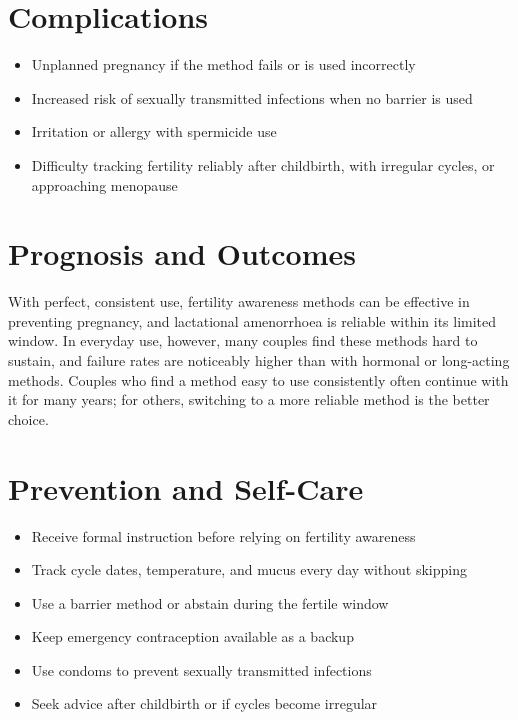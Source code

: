 \section*{Complications}
\begin{itemize}
    \item Unplanned pregnancy if the method fails or is used incorrectly
    \item Increased risk of sexually transmitted infections when no barrier is used
    \item Irritation or allergy with spermicide use
    \item Difficulty tracking fertility reliably after childbirth, with irregular cycles, or approaching menopause
\end{itemize}

\section*{Prognosis and Outcomes}
With perfect, consistent use, fertility awareness methods can be effective in preventing pregnancy, and lactational amenorrhoea is reliable within its limited window. In everyday use, however, many couples find these methods hard to sustain, and failure rates are noticeably higher than with hormonal or long-acting methods. Couples who find a method easy to use consistently often continue with it for many years; for others, switching to a more reliable method is the better choice.

\section*{Prevention and Self-Care}
\begin{itemize}
    \item Receive formal instruction before relying on fertility awareness
    \item Track cycle dates, temperature, and mucus every day without skipping
    \item Use a barrier method or abstain during the fertile window
    \item Keep emergency contraception available as a backup
    \item Use condoms to prevent sexually transmitted infections
    \item Seek advice after childbirth or if cycles become irregular
\end{itemize}
